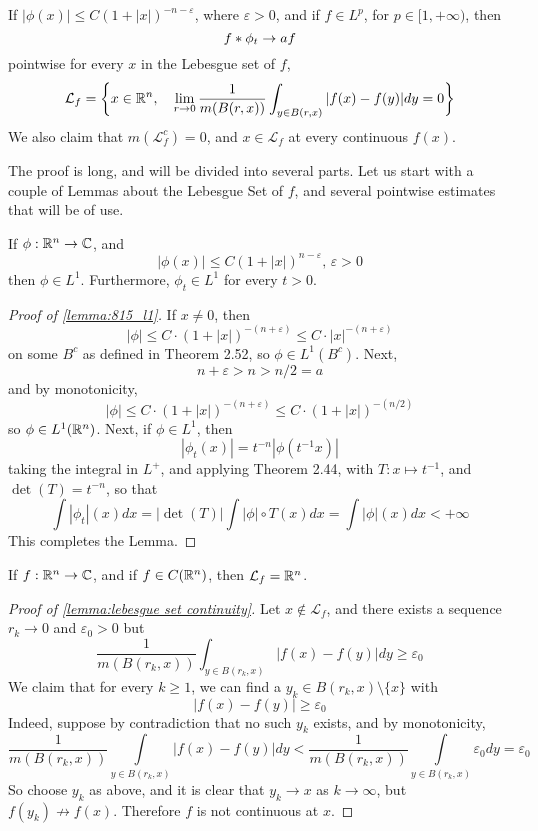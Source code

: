 \documentclass[../../main.tex]{subfiles}
\begin{document}
\providecommand{\wl}{\mathcal{L}}
\begin{wts}
    If $|\phi(x)|\leq C(1+|x|)^{-n-\varepsilon}$, where $\varepsilon>0$, and if $f\in L^p$, for $p\in[1,+\infty)$, then \[f\ast \phi_t\to af\]
    pointwise for every $x$ in the Lebesgue set of $f$, \[\mathcal{L}_f = \biggl\{{x\in{\mathbb{R}^n},\quad\lim_{r\to 0}\dfrac{1}{m(B(r,x))}\int_{y\in B(r,x)}|f(x)-f(y)|dy = 0}\biggr\}\]
    We also claim that $m(\mathcal{L}_f^c)=0$, and $x\in \mathcal{L}_f$ at every continuous $f(x)$.
\end{wts}
The proof is long, and will be divided into several parts. Let us start with a couple of Lemmas about the Lebesgue Set of $f$, and several pointwise estimates that will be of use.

\begin{lemma}\label{lemma:815_l1}
    If $\phi:{\mathbb{R}^n}\to\mathbb{C}$, and\begin{equation}\label{phi estimate}
    |\phi(x)|\leq C(1+|x|)^{n-\varepsilon},\,\varepsilon>0\end{equation}
    then $\phi\in L^1$. Furthermore, $\phi_t\in L^1$ for every $t>0$.
\end{lemma}
\begin{proof}[Proof of \ref{lemma:815_l1}]
    If $x\neq 0$, then
    \[
    |\phi|\leq C\cdot(1+|x|)^{-(n+\varepsilon)}\leq C\cdot|x|^{-(n+\varepsilon)}
    \]
    on some $B^c$ as defined in Theorem 2.52, so $\phi\in L^1(B^c)$. Next, \[n+\varepsilon>n>n/2=a\]
    and by monotonicity,\[|\phi|\leq C\cdot(1+|x|)^{-(n+\varepsilon)}\leq C\cdot (1+|x|)^{-(n/2)}\]
    so $\phi\in L^1({\mathbb{R}^n})$. Next, if $\phi\in L^1$, then\[|\phi_t(x)|=t^{-n}|\phi(t^{-1}x)|\]
    taking the integral in $L^+$, and applying Theorem 2.44, with $T:x\mapsto t^{-1}$, and $\det(T)=t^{-n}$, so that\[\int|\phi_t|(x)dx=|\det(T)|\int |\phi|\circ T(x)dx=\int |\phi|(x)dx<+\infty\]
    This completes the Lemma.
\end{proof}

\begin{lemma}\label{lemma:lebesgue set continuity}
    If $f:{\mathbb{R}^n}\to\mathbb{C}$, and if $f\in C({\mathbb{R}^n})$, then $\mathcal{L}_f={\mathbb{R}^n}$.
\end{lemma}
\begin{proof}[Proof of \ref{lemma:lebesgue set continuity}]
    Let $x\notin\wl_f$, and there exists a sequence $r_k\to 0$ and $\varepsilon_0>0$ but \[\dfrac{1}{m(B(r_k,x))}\int_{y\in B(r_k,x)}|f(x)-f(y)|dy\geq \varepsilon_0\]
    We claim that for every $k\geq 1$, we can find a $y_k\in B(r_k,x)\setminus\{x\}$ with\[|f(x)-f(y)|\geq\varepsilon_0\]
    Indeed, suppose by contradiction that no such $y_k$ exists, and by monotonicity, \[\dfrac{1}{m(B(r_k,x))}\int\limits_{y\in B(r_k,x)}|f(x)-f(y)|dy<\dfrac{1}{m(B(r_k,x))}\int\limits_{y\in B(r_k,x)}\varepsilon_0dy=\varepsilon_0\]
    So choose $y_k$ as above, and it is clear that $y_k\to x$ as $k\to\infty$, but $f(y_k)\not\to f(x)$. Therefore $f$ is not continuous at $x$.
\end{proof}
\end{document}
